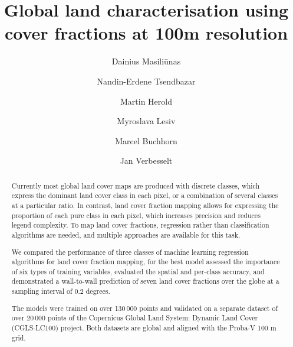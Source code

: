 \documentclass[review,authoryear,3p]{elsarticle}
\begin{document}
\begin{frontmatter} %

\title{Global land characterisation using cover fractions at 100m resolution}

\author[WURGRS]{Dainius Masiliūnas}

\author[WURGRS]{Nandin-Erdene Tsendbazar}

\author[WURGRS]{Martin Herold}

\author[IIASA]{Myroslava Lesiv}

\author[VITO]{Marcel Buchhorn}

\author[WURGRS]{Jan Verbesselt}

\address[WURGRS]{Wageningen University \& Research, Laboratory of Geo-Information Science and Remote Sensing, Droevendaalsesteeg 3, 6708 PB Wageningen, the Netherlands}
\address[IIASA]{International Institute for Applied Systems Analysis (IIASA), Schlossplatz 1, A-2361 Laxenburg, Austria}
\address[VITO]{Flemish Institute for Technological Research (VITO), Boeretang 200, BE-2400 Mol, Belgium}

\begin{abstract} %
Currently most global land cover maps are produced with discrete classes, which express the dominant land cover class in each pixel, or a combination of several classes at a particular ratio. In contrast, land cover fraction mapping allows for expressing the proportion of each pure class in each pixel, which increases precision and reduces legend complexity. To map land cover fractions, regression rather than classification algorithms are needed, and multiple approaches are available for this task.

We compared the performance of three classes of machine learning regression algorithms for land cover fraction mapping, for the best model assessed the importance of six types of training variables, evaluated the spatial and per-class accuracy, and demonstrated a wall-to-wall prediction of seven land cover fractions over the globe at a sampling interval of 0.2 degrees.

The models were trained on over 130\,000 points and validated on a separate dataset of over 20\,000 points of the Copernicus Global Land System: Dynamic Land Cover (CGLS-LC100) project. Both datasets are global and aligned with the Proba-V 100 m grid.


\end{abstract}
\end{frontmatter}
\end{document}
